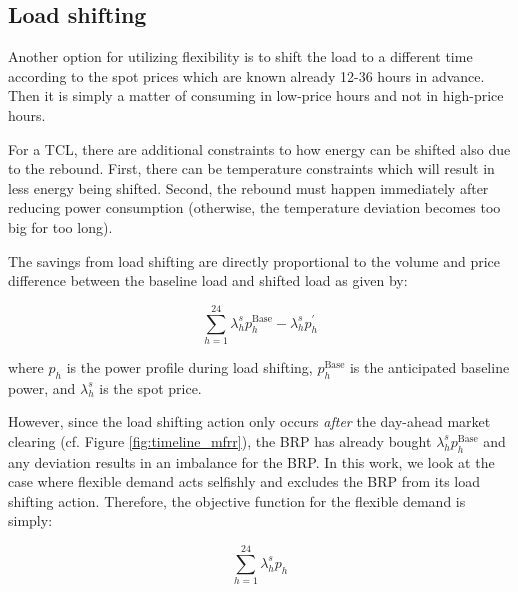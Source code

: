 \subsection{Load shifting}

Another option for utilizing flexibility is to shift the load to a different time according to the spot prices which are known already 12-36 hours in advance. Then it is simply a matter of consuming in low-price hours and not in high-price hours.

For a TCL, there are additional constraints to how energy can be shifted also due to the rebound. First, there can be temperature constraints which will result in less energy being shifted. Second, the rebound must happen immediately after reducing power consumption (otherwise, the temperature deviation becomes too big for too long).

The savings from load shifting are directly proportional to the volume and price difference between the baseline load and shifted load as given by:

\begin{equation}\label{eq:load_shifting_savings}
    \sum_{h=1}^{24} \lambda^{s}_{h} p^{\text{Base}}_{h} - \lambda^{s}_{h} p^{\prime}_{h}
\end{equation}

where $p_{h}$ is the power profile during load shifting, $p^{\text{Base}}_{h}$ is the anticipated baseline power, and $\lambda^{s}_{h}$ is the spot price.

However, since the load shifting action only occurs \textit{after} the day-ahead market clearing (cf. Figure \ref{fig:timeline_mfrr}), the BRP has already bought $\lambda^{s}_{h} p^{\text{Base}}_{h}$ and any deviation results in an imbalance for the BRP. In this work, we look at the case where flexible demand acts selfishly and excludes the BRP from its load shifting action. Therefore, the objective function for the flexible demand is simply:

\begin{equation}\label{eq:LoadShiftingObjective}
    \sum_{h=1}^{24} \lambda_{h}^{s} p_{h}
\end{equation}
